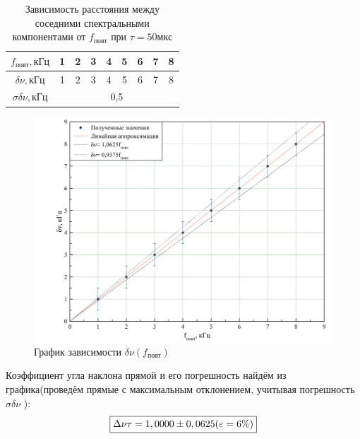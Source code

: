 \documentclass[a4paper, 12pt,twoside]{article}
\begin{document}
\begin{table}[H]
	\centering
	\caption{Зависимость расстояния между соседними спектральными компонентами от $f_\text{повт}$ при $\tau = 50 \text{мкс}$ }
	\label{my-label}
	\begin{tabular}{|c|c|c|c|c|c|c|c|c}
		\hline
		$f_\text{повт}, \text{кГц}$ & 1 & 2 & 3 & 4 & 5 & 6 & 7 & \multicolumn{1}{c|}{8} \\ \hline
		$\delta \nu, \text{кГц}$    & 1 & 2 & 3 & 4 & 5 & 6 & 7 & \multicolumn{1}{c|}{8} \\ \hline
		$\sigma \delta \nu, \text{кГц}$         & \multicolumn{8}{c|}{0,5}                           \\ \hline
	\end{tabular}
\end{table}

\begin{figure}[H]
\centering
\includegraphics[width = \textwidth]{graphic}
\caption{График зависимости $\delta \nu (f_\text{повт})$}
\end{figure}

Коэффициент угла наклона прямой и его погрешность найдём из графика(проведём прямые с максимальным отклонением, учитывая погрешность $\sigma\delta\nu$ ): 
\begin{equation*}
\fbox{$
\Delta \nu \tau = 1,0000 \pm 0,0625(\varepsilon = 6 \%)$}
\end{equation*}
\end{document}
